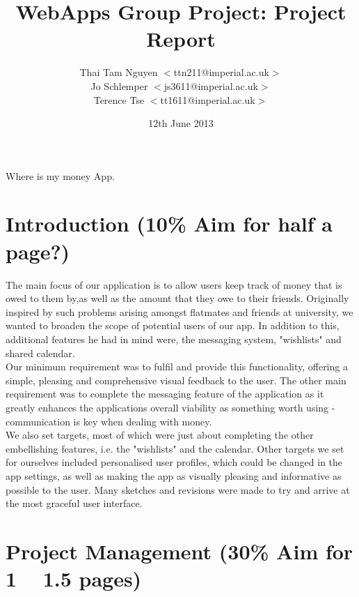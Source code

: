 \documentclass[a4paper,11pt]{article}
\begin{document}
\title{WebApps Group Project: Project Report} \date{12th June
  2013} \author{
  Thai Tam Nguyen $<$ttn211@imperial.ac.uk$>$\\
  Jo Schlemper $<$js3611@imperial.ac.uk$>$\\
  Terence Tse  $<$tt1611@imperial.ac.uk$>$ }
\maketitle

Where is my money App.
\section*{Introduction (10\% Aim for half a page?)}

The main focus of our application is to allow users  keep track of money that is owed to them by,as well as the amount that they owe to their friends. Originally inspired by such problems arising amongst flatmates and friends at university, we wanted to broaden the scope of potential users of our app. In addition to this, additional features he had in mind were, the messaging system, "wishlists" and shared calendar.
\\
Our minimum requirement was to fulfil and provide this functionality, offering a simple, pleasing and comprehensive visual feedback to the user. The other main requirement was to complete the messaging feature of the application as it greatly enhances the applications overall viability as something worth using - communication is key when dealing with money.
\\
We also set targets, most of which were just about completing the other embellishing features, i.e. the "wishlists" and the calendar. Other targets we set for ourselves included personalised user profiles, which could be changed in the app settings, as well as making the app as visually pleasing and informative as possible to the user. Many sketches and revisions were made to try and arrive at the most graceful user interface.



\section*{Project Management (30\% Aim for 1 ~ 1.5 pages)}
\end{document}
